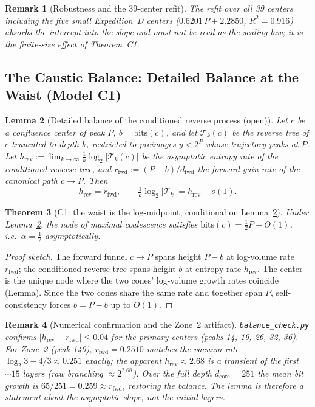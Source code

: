 \documentclass[12pt,a4paper]{article}
\newtheorem{theorem}{Theorem}[section]
\newtheorem{lemma}[theorem]{Lemma}
\newtheorem{remark}[theorem]{Remark}
\begin{document}
\begin{remark}[Robustness and the 39-center refit]
The refit over all 39 centers including the five small Expedition~D centers
($0.6201\,P+2.2850$, $R^2=0.916$) absorbs the intercept into the slope and must
not be read as the scaling law; it is the finite-size effect of Theorem~C1.
\end{remark}

\subsection{The Caustic Balance: Detailed Balance at the Waist (Model C1)}

\begin{lemma}[Detailed balance of the conditioned reverse process (open)]
\label{lem:detail_balance}
Let $c$ be a confluence center of peak $P$, $b=\mathrm{bits}(c)$, and let
$\mathcal T_k(c)$ be the reverse tree of $c$ truncated to depth $k$, restricted to
preimages $y<2^P$ whose trajectory peaks at $P$. Let
$h_{\mathrm{rev}}:=\lim_{k\to\infty}\tfrac1k\log_2|\mathcal T_k(c)|$ be the asymptotic
entropy rate of the conditioned reverse tree, and
$r_{\mathrm{fwd}}:=(P-b)/d_{\mathrm{fwd}}$ the forward gain rate of the canonical path
$c\to P$. Then
\[
h_{\mathrm{rev}}=r_{\mathrm{fwd}},\qquad
\tfrac1k\log_2|\mathcal T_k|=h_{\mathrm{rev}}+o(1).
\]
\end{lemma}

\begin{theorem}[C1: the waist is the log-midpoint, conditional on
Lemma~\ref{lem:detail_balance}]
\label{thm:C1}
Under Lemma~\ref{lem:detail_balance}, the node of maximal coalescence satisfies
$\mathrm{bits}(c)=\tfrac12 P+O(1)$, i.e.\ $\alpha=\tfrac12$ asymptotically.
\end{theorem}

\begin{proof}[Proof sketch]
The forward funnel $c\to P$ spans height $P-b$ at log-volume rate $r_{\mathrm{fwd}}$;
the conditioned reverse tree spans height $b$ at entropy rate $h_{\mathrm{rev}}$. The
center is the unique node where the two cones' log-volume growth rates coincide
(Lemma). Since the two cones share the same rate and together span $P$, self-consistency
forces $b=P-b$ up to $O(1)$.
\end{proof}

\begin{remark}[Numerical confirmation and the Zone~2 artifact]
\texttt{balance\_check.py} confirms $|h_{\mathrm{rev}}-r_{\mathrm{fwd}}|\le0.04$ for the
primary centers (peaks 14, 19, 26, 32, 36). For Zone~2 (peak 140),
$r_{\mathrm{fwd}}=0.2510$ matches the vacuum rate $\log_2 3-4/3\approx0.251$ exactly; the
apparent $h_{\mathrm{rev}}\approx2.68$ is a transient of the first $\sim15$ layers (raw
branching $\approx2^{2.68}$). Over the full depth $d_{\mathrm{core}}=251$ the mean bit
growth is $65/251=0.259\approx r_{\mathrm{fwd}}$, restoring the balance. The lemma is
therefore a statement about the \emph{asymptotic} slope, not the initial layers.
\end{remark}
\end{document}
